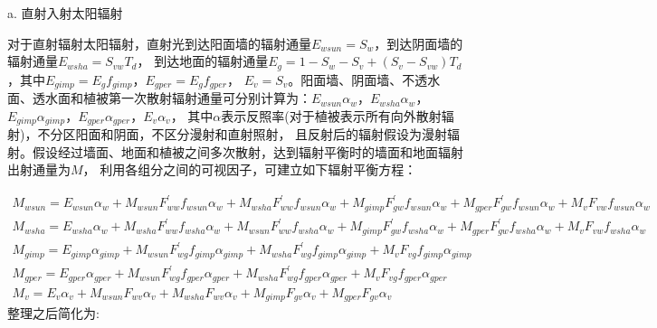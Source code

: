 a. 直射入射太阳辐射

对于直射辐射太阳辐射，直射光到达阳面墙的辐射通量$E_{wsun}=S_w$，到达阴面墙的辐射通量$E_{wsha}=S_{vw}T_d$，
到达地面的辐射通量$E_g=1-S_w-S_v+\left(S_v-S_{vw}\right)T_d$，其中$E_{gimp}=E_gf_{gimp}$，$E_{gper}=E_gf_{gper}$，
$E_v=S_v$。阳面墙、阴面墙、不透水面、透水面和植被第一次散射辐射通量可分别计算为：$E_{wsun}\alpha_w$，$E_{wsha}\alpha_w$，
$E_{gimp}\alpha_{gimp}$，$E_{gper}\alpha_{gper}$，$E_v\alpha_v$，
其中$\alpha$表示反照率(对于植被表示所有向外散射辐射)，不分区阳面和阴面，不区分漫射和直射照射，
且反射后的辐射假设为漫射辐射。假设经过墙面、地面和植被之间多次散射，达到辐射平衡时的墙面和地面辐射出射通量为$M$，
利用各组分之间的可视因子，可建立如下辐射平衡方程：
\begin{landscape}
\begin{equation}
\begin{array}{l}M_{wsun}=E_{wsun} \alpha_{w}+M_{wsun} F_{ww}^{\prime} f_{wsun} \alpha_{w}+M_{wsha} F_{ww}^{\prime} f_{wsun} \alpha_{w}+M_{gimp} F_{g w}^{\prime} f_{wsun} \alpha_{w}+M_{gper} F_{g w}^{\prime} f_{wsun} \alpha_{w}+M_{v} F_{v w} f_{wsun} \alpha_{w} \\ M_{wsha}=E_{wsha} \alpha_{w}+M_{wsha} F_{ww}^{\prime} f_{wsha} \alpha_{w}+M_{wsun} F_{ww}^{\prime} f_{wsha} \alpha_{w}+M_{gimp} F_{g w}^{\prime} f_{wsha} \alpha_{w}+M_{gper} F_{g w}^{\prime} f_{wsha} \alpha_{w}+M_{v} F_{v w} f_{wsha} \alpha_{w} \\ M_{gimp}=E_{gimp} \alpha_{gimp}+M_{wsun} F_{w g}^{\prime} f_{gimp} \alpha_{gimp}+M_{wsha} F_{w g}^{\prime} f_{gimp} \alpha_{gimp}+M_{v} F_{v g} f_{gimp} \alpha_{gimp} \\ M_{gper}=E_{gper} \alpha_{gper}+M_{wsun} F_{w g}^{\prime} f_{gper} \alpha_{gper}+M_{wsha} F_{w g}^{\prime} f_{gper} \alpha_{gper}+M_{v} F_{v g} f_{gper} \alpha_{gper} \\ M_{v}=E_{v} \alpha_{v}+M_{wsun} F_{w v} \alpha_{v}+M_{wsha} F_{w v} \alpha_{v}+M_{gimp} F_{g v} \alpha_{v}+M_{gper} F_{g v} \alpha_{v}\end{array}
\end{equation}
整理之后简化为:
\begin{equation}

\end{equation}
\end{landscape}
